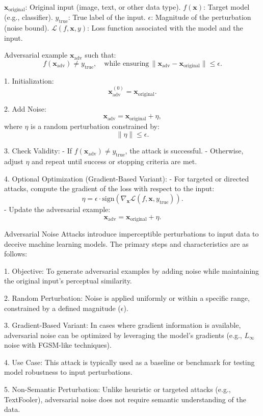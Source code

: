 $\mathbf{x}_{\text{original}}$: Original input (image, text, or other data type).
$f(\mathbf{x})$: Target model (e.g., classifier).
$y_{\text{true}}$: True label of the input.
$\epsilon$: Magnitude of the perturbation (noise bound).
$\mathcal{L}(f, \mathbf{x}, y)$: Loss function associated with the model and the input.

Adversarial example $\mathbf{x}_{\text{adv}}$ such that:
\[
f(\mathbf{x}_{\text{adv}}) \neq y_{\text{true}}, \quad \text{while ensuring} \, \|\mathbf{x}_{\text{adv}} - \mathbf{x}_{\text{original}}\| \leq \epsilon.
\]

1. Initialization:
   \[
   \mathbf{x}_{\text{adv}}^{(0)} = \mathbf{x}_{\text{original}}.
   \]

2. Add Noise:
   \[
   \mathbf{x}_{\text{adv}} = \mathbf{x}_{\text{original}} + \eta,
   \]
   where $\eta$ is a random perturbation constrained by:
   \[
   \|\eta\| \leq \epsilon.
   \]

3. Check Validity:
   - If $f(\mathbf{x}_{\text{adv}}) \neq y_{\text{true}}$, the attack is successful.
   - Otherwise, adjust $\eta$ and repeat until success or stopping criteria are met.

4. Optional Optimization (Gradient-Based Variant):
   - For targeted or directed attacks, compute the gradient of the loss with respect to the input:
     \[
     \eta = \epsilon \cdot \text{sign}(\nabla_{\mathbf{x}} \mathcal{L}(f, \mathbf{x}, y_{\text{true}})).
     \]
   - Update the adversarial example:
     \[
     \mathbf{x}_{\text{adv}} = \mathbf{x}_{\text{original}} + \eta.
     \]

Adversarial Noise Attacks introduce imperceptible perturbations to input data to deceive machine learning models. The primary steps and characteristics are as follows:

1. Objective: To generate adversarial examples by adding noise while maintaining the original input's perceptual similarity.

2. Random Perturbation: Noise is applied uniformly or within a specific range, constrained by a defined magnitude ($\epsilon$).

3. Gradient-Based Variant: In cases where gradient information is available, adversarial noise can be optimized by leveraging the model's gradients (e.g., $L_\infty$ noise with FGSM-like techniques).

4. Use Case: This attack is typically used as a baseline or benchmark for testing model robustness to input perturbations.

5. Non-Semantic Perturbation: Unlike heuristic or targeted attacks (e.g., TextFooler), adversarial noise does not require semantic understanding of the data.
